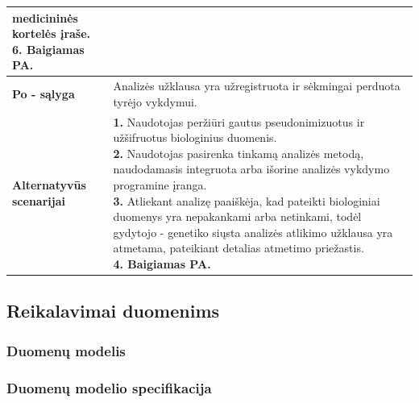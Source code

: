 \documentclass[12pt]{article}
\begin{document}
\begin{table}[htb!]
\begin{tabular}{|m{3cm}|m{13.7cm}|}
{{            medicininės kortelės įraše. \\
            \textbf{6. Baigiamas PA.}
        }}
        \\
        \hline
        \raggedleft \textbf{\cellcolor{deepchampagne}Po - sąlyga} &
        Analizės užklausa yra užregistruota ir sėkmingai perduota tyrėjo
        vykdymui. \\
        \hline
        \raggedleft \textbf{\cellcolor{deepchampagne}Alternatyvūs scenarijai} &
        \vskip 5pt
        \makecell[l]{\parbox[t]{13.7cm}{
            \textbf{1.} \textcolor{dartmouthgreen}{Naudotojas peržiūri gautus
            pseudonimizuotus ir užšifruotus biologinius duomenis.} \\
            \textbf{2.} \textcolor{dartmouthgreen}{Naudotojas pasirenka tinkamą
            analizės metodą, naudodamasis integruota arba išorine analizės
            vykdymo programine įranga.} \\
            \textbf{3.} \textcolor{dartmouthgreen}{Atliekant analizę paaiškėja,
            kad pateikti biologiniai duomenys yra nepakankami arba netinkami,
            todėl gydytojo - genetiko siųsta analizės atlikimo užklausa yra
            atmetama, pateikiant detalias atmetimo priežastis.} \\
            \textbf{4. Baigiamas PA.}
        }}
        \\
        \hline
    \end{tabular}
\end{table}

\newpage

\subsection{Reikalavimai duomenims}
\subsubsection{Duomenų modelis}

\subsubsection{Duomenų modelio specifikacija}
\end{document}
